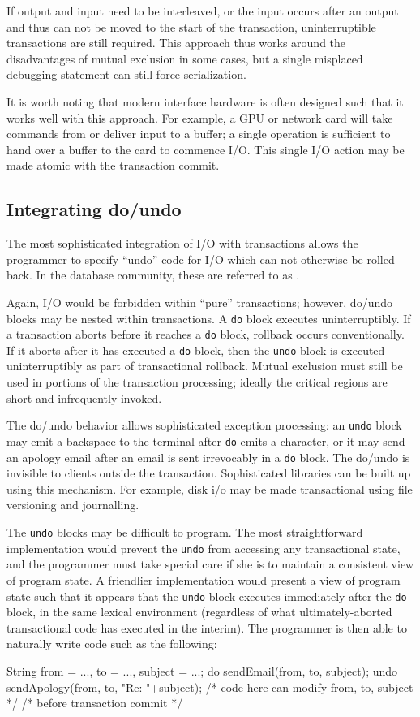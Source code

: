 If output and input need to be interleaved, or the input occurs after
an output and thus can not be moved to the start of the transaction,
uninterruptible transactions are still required.  This approach thus
works around the disadvantages of mutual exclusion in some cases, but
a single misplaced debugging statement can still force serialization.

It is worth noting that modern interface hardware is often designed
such that it works well with this approach.  For example, a GPU
or network card will take commands from or deliver input to a
buffer; a single operation is sufficient to hand over a buffer to
the card to commence I/O\@.  This single I/O action may be made atomic
with the transaction commit.

\subsection{Integrating do/undo}
The most sophisticated integration of I/O with transactions allows the
programmer to specify ``undo'' code for I/O which can not otherwise be
rolled back.  In the database community, these are referred to as
.

Again, I/O would be forbidden within ``pure'' transactions; however,
do/undo blocks may be nested within transactions.  A \texttt{do} block
executes uninterruptibly.  If a transaction aborts before it reaches a
\texttt{do} block, rollback occurs conventionally.  If it aborts after it
has executed a \texttt{do} block, then the \texttt{undo} block is
executed uninterruptibly as part of transactional rollback.
Mutual exclusion must still be used in portions of the transaction
processing; ideally the critical regions are short and infrequently
invoked.

The do/undo behavior allows sophisticated exception processing: an
\texttt{undo} block may emit a backspace to the terminal after
\texttt{do} emits a character, or it may send an apology email after
an email is sent irrevocably in a \texttt{do} block.  The do/undo is
invisible to clients outside the transaction.  Sophisticated
libraries can be built up using this mechanism.  For example, disk i/o
may be made transactional using file versioning and journalling.

The \texttt{undo} blocks may be difficult to program.  The most
straightforward implementation would prevent the \texttt{undo} from
accessing any transactional state, and the programmer must take
special care if she is to maintain a consistent view of program state.
A friendlier implementation would present a view of program state such
that it appears that the \texttt{undo} block executes immediately
after the \texttt{do} block, in the same lexical environment
(regardless of what ultimately-aborted transactional code has executed
in the interim).  The programmer is then able to naturally write code
such as the following:
\begin{inlinecode}
String from = ..., to = ..., subject = ...;
do {
  sendEmail(from, to, subject);
} undo {
  sendApology(from, to, "Re: "+subject);
}
/* code here can modify from, to, subject */
/* before transaction commit */
\end{inlinecode}

